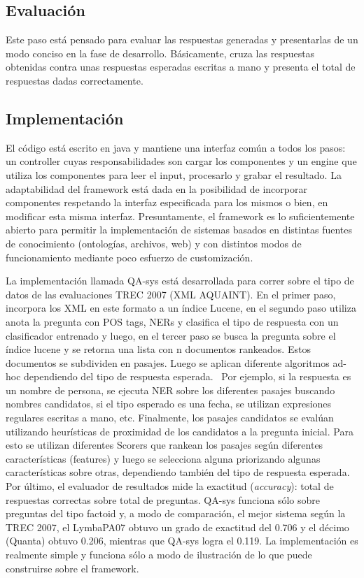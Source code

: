 \subsection{Evaluación}

Este paso está pensado para evaluar las respuestas generadas y
presentarlas de un modo conciso en la fase de desarrollo.
Básicamente, cruza las respuestas obtenidas contra unas respuestas
esperadas escritas a mano y presenta el total de respuestas dadas
correctamente.


\bigskip

\subsection{Implementación}

El código está escrito en java y mantiene una interfaz común a
todos los pasos: un controller cuyas responsabilidades son cargar los
componentes y un engine que utiliza los componentes para leer el input,
procesarlo y grabar el resultado. La adaptabilidad del framework está
dada en la posibilidad de incorporar componentes respetando la interfaz
especificada para los mismos o bien, en modificar esta misma interfaz.
Presuntamente, el framework es lo suficientemente abierto para permitir
la implementación de sistemas basados en distintas fuentes de
conocimiento (ontologías, archivos, web) y con distintos modos de
funcionamiento mediante poco esfuerzo de customización.

La implementación llamada QA-sys está desarrollada para correr sobre
el tipo de datos de las evaluaciones TREC 2007 (XML AQUAINT). En el
primer paso, incorpora los XML en este formato a un índice Lucene, en
el segundo paso utiliza anota la pregunta con POS tags, NERs y
clasifica el tipo de respuesta con un clasificador entrenado y luego,
en el tercer paso se busca la pregunta sobre el índice lucene y se
retorna una lista con n documentos rankeados. Estos documentos se
subdividen en pasajes. Luego se aplican diferente algoritmos ad-hoc
dependiendo del tipo de respuesta esperada. \ Por ejemplo, si la
respuesta es un nombre de persona, se ejecuta NER sobre los diferentes
pasajes buscando nombres candidatos, si el tipo esperado es una fecha,
se utilizan expresiones regulares escritas a mano, etc. Finalmente, los
pasajes candidatos se evalúan utilizando heurísticas de proximidad
de los candidatos a la pregunta inicial. Para esto se utilizan
diferentes Scorers que rankean los pasajes según diferentes
características (features) y luego se selecciona alguna priorizando
algunas características sobre otras, dependiendo también del tipo
de respuesta esperada. Por último, el evaluador de resultados mide la
exactitud (\textit{accuracy}): total de respuestas correctas sobre
total de preguntas. QA-sys funciona sólo sobre preguntas del tipo
factoid y, a modo de comparación, el mejor sistema según la TREC
2007, el LymbaPA07 obtuvo un grado de exactitud del 0.706 y el décimo
(Quanta) obtuvo 0.206, mientras que QA-sys logra el 0.119. La
implementación es realmente simple y funciona sólo a modo de
ilustración de lo que puede construirse sobre el framework. 

